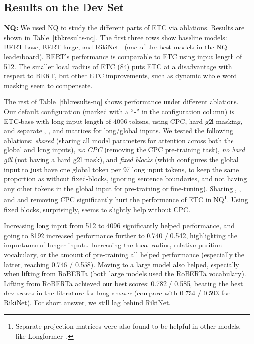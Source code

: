 \documentclass[11pt,a4paper]{article}
\begin{document}
\subsection{Results on the Dev Set}

{\bf NQ:} We used NQ to study the different parts of ETC via ablations. Results are shown in Table~\ref{tbl:results-nq}. The first three rows show baseline models: BERT-base, BERT-large, and RikiNet~\cite{liu2020rikinet} (one of the best models in the NQ leaderboard). 
BERT's performance is comparable to ETC using input length of 512. The smaller local radius of ETC (84) puts ETC at a disadvantage with respect to BERT, but other ETC improvements, such as dynamic whole word masking seem to compensate. 

The rest of Table~\ref{tbl:results-nq} shows performance under different ablations. Our default configuration (marked with a ``-'' in the configuration column) is ETC-base with long input length of 4096 tokens, using CPC, hard g2l masking, and separate , , and  matrices for long/global inputs. We tested the following ablations: {\em shared} (sharing all model parameters for attention across both the global and long inputs), {\em no CPC} (removing the CPC pre-training task), {\em no hard g2l} (not having a hard g2l mask), and {\em fixed blocks} (which configures the global input to just have one global token per 97 long input tokens, to keep the same proportion as without fixed-blocks, ignoring sentence boundaries, and not having any other tokens in the global input for pre-training or fine-tuning). 
Sharing , , and  and removing CPC significantly hurt the performance of ETC in NQ\footnote{Separate projection matrices were also found to be helpful in other models, like Longformer~\cite{beltagy2020longformer}.}. Using fixed blocks, surprisingly, seems to slightly help without CPC.

Increasing long input from 512 to 4096 significantly helped performance, and going to 8192 increased performance further to 0.740 / 0.542, highlighting the importance of longer inputs. Increasing the local radius, relative position vocabulary, or the amount of pre-training all helped performance (especially the latter, reaching 0.746 / 0.558). 
Moving to a large model also helped, especially when lifting from RoBERTa (both large models used the RoBERTa vocabulary). Lifting from RoBERTa achieved our best scores: 0.782 / 0.585, beating the best dev scores in the literature for long answer (compare with 0.754 / 0.593 for RikiNet). For short answer, we still lag behind RikiNet.
\end{document}
